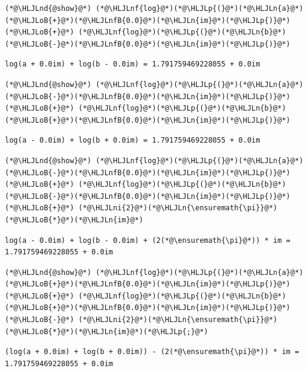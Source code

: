 \documentclass[12pt,a4paper]{article}
\newcommand{\HLJLn}[1]{#1}
\newcommand{\HLJLnd}[1]{\textcolor[RGB]{214,102,97}{#1}}
\newcommand{\HLJLnf}[1]{\textcolor[RGB]{66,102,213}{#1}}
\newcommand{\HLJLnfB}[1]{\textcolor[RGB]{59,151,46}{#1}}
\newcommand{\HLJLni}[1]{\textcolor[RGB]{59,151,46}{#1}}
\newcommand{\HLJLoB}[1]{\textcolor[RGB]{102,102,102}{\textbf{#1}}}
\newcommand{\HLJLp}[1]{#1}
\begin{document}
\begin{lstlisting}
(*@\HLJLnd{@show}@*) (*@\HLJLnf{log}@*)(*@\HLJLp{(}@*)(*@\HLJLn{a}@*)(*@\HLJLoB{+}@*)(*@\HLJLnfB{0.0}@*)(*@\HLJLn{im}@*)(*@\HLJLp{)}@*) (*@\HLJLoB{+}@*) (*@\HLJLnf{log}@*)(*@\HLJLp{(}@*)(*@\HLJLn{b}@*)(*@\HLJLoB{-}@*)(*@\HLJLnfB{0.0}@*)(*@\HLJLn{im}@*)(*@\HLJLp{)}@*)
\end{lstlisting}

\begin{lstlisting}
log(a + 0.0im) + log(b - 0.0im) = 1.791759469228055 + 0.0im
\end{lstlisting}


\begin{lstlisting}
(*@\HLJLnd{@show}@*) (*@\HLJLnf{log}@*)(*@\HLJLp{(}@*)(*@\HLJLn{a}@*)(*@\HLJLoB{-}@*)(*@\HLJLnfB{0.0}@*)(*@\HLJLn{im}@*)(*@\HLJLp{)}@*) (*@\HLJLoB{+}@*) (*@\HLJLnf{log}@*)(*@\HLJLp{(}@*)(*@\HLJLn{b}@*)(*@\HLJLoB{+}@*)(*@\HLJLnfB{0.0}@*)(*@\HLJLn{im}@*)(*@\HLJLp{)}@*)
\end{lstlisting}

\begin{lstlisting}
log(a - 0.0im) + log(b + 0.0im) = 1.791759469228055 + 0.0im
\end{lstlisting}


\begin{lstlisting}
(*@\HLJLnd{@show}@*) (*@\HLJLnf{log}@*)(*@\HLJLp{(}@*)(*@\HLJLn{a}@*)(*@\HLJLoB{-}@*)(*@\HLJLnfB{0.0}@*)(*@\HLJLn{im}@*)(*@\HLJLp{)}@*) (*@\HLJLoB{+}@*) (*@\HLJLnf{log}@*)(*@\HLJLp{(}@*)(*@\HLJLn{b}@*)(*@\HLJLoB{-}@*)(*@\HLJLnfB{0.0}@*)(*@\HLJLn{im}@*)(*@\HLJLp{)}@*) (*@\HLJLoB{+}@*) (*@\HLJLni{2}@*)(*@\HLJLn{\ensuremath{\pi}}@*)(*@\HLJLoB{*}@*)(*@\HLJLn{im}@*)
\end{lstlisting}

\begin{lstlisting}
log(a - 0.0im) + log(b - 0.0im) + (2(*@\ensuremath{\pi}@*)) * im = 1.791759469228055 + 0.0im
\end{lstlisting}


\begin{lstlisting}
(*@\HLJLnd{@show}@*) (*@\HLJLnf{log}@*)(*@\HLJLp{(}@*)(*@\HLJLn{a}@*)(*@\HLJLoB{+}@*)(*@\HLJLnfB{0.0}@*)(*@\HLJLn{im}@*)(*@\HLJLp{)}@*) (*@\HLJLoB{+}@*) (*@\HLJLnf{log}@*)(*@\HLJLp{(}@*)(*@\HLJLn{b}@*)(*@\HLJLoB{+}@*)(*@\HLJLnfB{0.0}@*)(*@\HLJLn{im}@*)(*@\HLJLp{)}@*) (*@\HLJLoB{-}@*) (*@\HLJLni{2}@*)(*@\HLJLn{\ensuremath{\pi}}@*)(*@\HLJLoB{*}@*)(*@\HLJLn{im}@*)(*@\HLJLp{;}@*)
\end{lstlisting}

\begin{lstlisting}
(log(a + 0.0im) + log(b + 0.0im)) - (2(*@\ensuremath{\pi}@*)) * im = 1.791759469228055 + 0.0im
\end{lstlisting}
\end{document}
